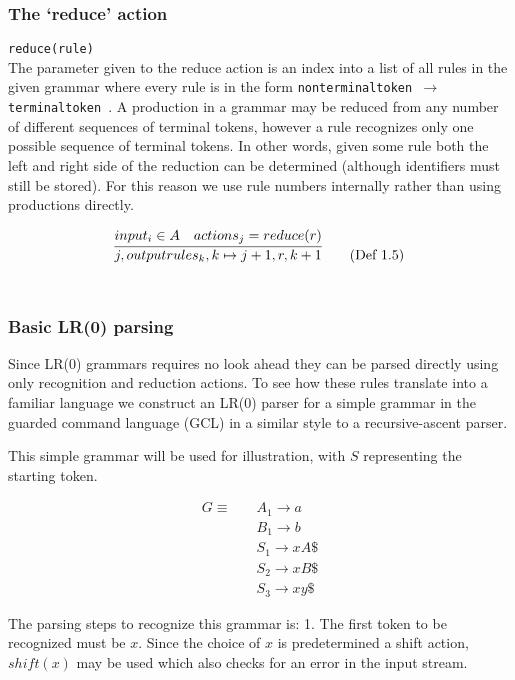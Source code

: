 \documentclass[11pt]{article}
\begin{document}
\subsubsection{The `reduce' action}
\texttt{reduce(rule)}\\
The parameter given to the reduce action is an index into a list of all rules in the given grammar where every rule is in the form \texttt{nonterminaltoken $\rightarrow$ terminaltoken \textellipsis}. 
A production in a grammar may be reduced from any number of different sequences of terminal tokens, however a rule recognizes only one possible sequence of terminal tokens.
In other words, given some rule both the left and right side of the reduction can be determined (although identifiers must still be stored).
For this reason we use rule numbers internally rather than using productions directly.

\begin{equation}
\infer{j, outputrules_k, k \mapsto j+1, r, k+1}{input_i \in A & actions_j = reduce(r)} \tag{Def 1.5}
\end{equation}\\

\subsubsection{Basic LR(0) parsing}

Since LR(0) grammars requires no look ahead they can be parsed directly using only recognition and reduction actions.
To see how these rules translate into a familiar language we construct an LR(0) parser for a simple grammar in the guarded command language (GCL) in a similar style to a recursive-ascent parser.

This simple grammar will be used for illustration, with $S$ representing the starting token.

\begin{align*}
G \equiv \quad & A_1 \rightarrow a\\
               & B_1 \rightarrow b\\
               & S_1 \rightarrow x A \$\\
               & S_2 \rightarrow x B \$\\
               & S_3 \rightarrow x y \$
\end{align*}

The parsing steps to recognize this grammar is:
1. The first token to be recognized must be $x$. Since the choice of $x$ is predetermined a shift action, $shift(x)$ may be used which also checks for an error in the input stream.
\end{document}
